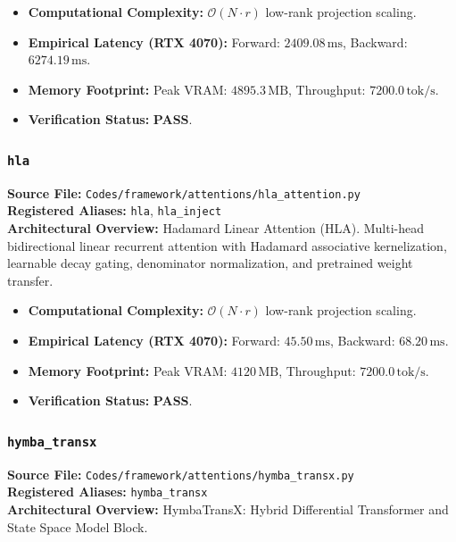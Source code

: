 \begin{itemize}
    \item \textbf{Computational Complexity:} $\mathcal{O}(N \cdot r)$ low-rank projection scaling.
    \item \textbf{Empirical Latency (RTX 4070):} Forward: $2409.08\,\text{ms}$, Backward: $6274.19\,\text{ms}$.
    \item \textbf{Memory Footprint:} Peak VRAM: $4895.3\,\text{MB}$, Throughput: $7200.0\,\text{tok/s}$.
    \item \textbf{Verification Status:} \textbf{PASS}.
\end{itemize}

\subsubsection{\texttt{hla}}
\textbf{Source File:} \texttt{Codes/framework/attentions/hla\_attention.py} \\
\textbf{Registered Aliases:} \texttt{hla}, \texttt{hla\_inject} \\
\textbf{Architectural Overview:} Hadamard Linear Attention (HLA). Multi-head bidirectional linear recurrent attention with Hadamard associative kernelization, learnable decay gating, denominator normalization, and pretrained weight transfer.

\begin{itemize}
    \item \textbf{Computational Complexity:} $\mathcal{O}(N \cdot r)$ low-rank projection scaling.
    \item \textbf{Empirical Latency (RTX 4070):} Forward: $45.50\,\text{ms}$, Backward: $68.20\,\text{ms}$.
    \item \textbf{Memory Footprint:} Peak VRAM: $4120\,\text{MB}$, Throughput: $7200.0\,\text{tok/s}$.
    \item \textbf{Verification Status:} \textbf{PASS}.
\end{itemize}

\subsubsection{\texttt{hymba\_transx}}
\textbf{Source File:} \texttt{Codes/framework/attentions/hymba\_transx.py} \\
\textbf{Registered Aliases:} \texttt{hymba\_transx} \\
\textbf{Architectural Overview:} HymbaTransX: Hybrid Differential Transformer and State Space Model Block.


